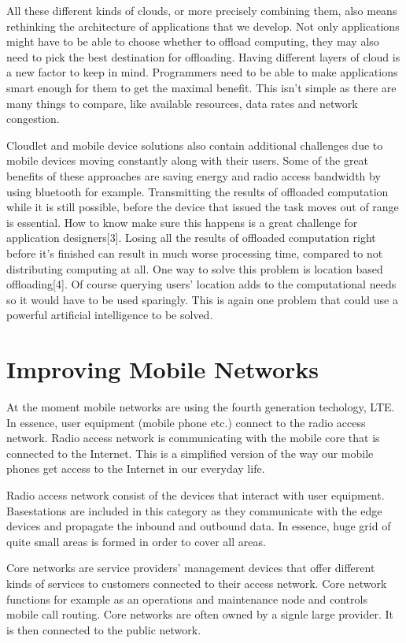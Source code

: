 \documentclass[conference]{IEEEtran}
\begin{document}
\par
All these different kinds of clouds, or more precisely combining them, also means rethinking the architecture of applications that we develop. Not only applications might have to be able to choose whether to offload computing, they may also need to pick the best destination for offloading. Having different layers of cloud is a new factor to keep in mind. Programmers need to be able to make applications smart enough for them to get the maximal benefit. This isn't simple as there are many things to compare, like available resources, data rates and network congestion.
\par
Cloudlet and mobile device solutions also contain additional challenges due to mobile devices moving constantly along with their users. Some of the great benefits of these approaches are saving energy and radio access bandwidth by using bluetooth for example. Transmitting the results of offloaded computation while it is still possible, before the device that issued the task moves out of range is essential. How to know make sure this happens is a great challenge for application designers[3]. Losing all the results of offloaded computation right before it's finished can result in much worse processing time, compared to not distributing computing at all. One way to solve this problem is location based offloading[4]. Of course querying users' location adds to the computational needs so it would have to be used sparingly. This is again one problem that could use a powerful artificial intelligence to be solved.

\section{Improving Mobile Networks}
At the moment mobile networks are using the fourth generation techology, LTE. In essence, user equipment (mobile phone etc.) connect to the radio access network. Radio access network is communicating with the mobile core that is connected to the Internet. This is a simplified version of the way our mobile phones get access to the Internet in our everyday life.
\par
Radio access network consist of the devices that interact with user equipment. Basestations are included in this category as they communicate with the edge devices and propagate the inbound and outbound data. In essence, huge grid of quite small areas is formed in order to cover all areas.
\par
Core networks are service providers' management devices that offer different kinds of services to customers connected to their access network. Core network functions for example as an operations and maintenance node and controls mobile call routing. Core networks are often owned by a signle large provider. It is then connected to the public network.
\end{document}
